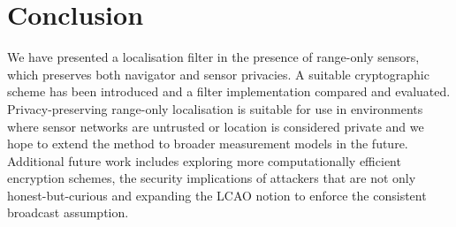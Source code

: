 \documentclass[10pt,letterpaper,oneside,twocolumn,journal]{IEEEtran}
\theoremstyle{definition}
\theoremstyle{definition}
\theoremstyle{remark}
\begin{document}
\section{Conclusion} \label{sec:conclusion}
We have presented a localisation filter in the presence of range-only sensors, which preserves both navigator and sensor privacies. A suitable cryptographic scheme has been introduced and a filter implementation compared and evaluated. Privacy-preserving range-only localisation is suitable for use in environments where sensor networks are untrusted or location is considered private and we hope to extend the method to broader measurement models in the future. Additional future work includes exploring more computationally efficient encryption schemes, the security implications of attackers that are not only honest-but-curious and expanding the LCAO notion to enforce the consistent broadcast assumption.

% 
%                                                                                         
%                                                                                         
%                                                                                         
% 

\appendices
\end{document}
